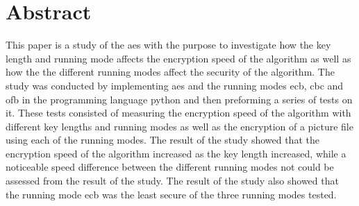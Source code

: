 \documentclass[a4paper, 12pt]{report}
\newcommand{\fakechapter}[2]{%
  \par\setcounter{chapter}{#2}
  \chaptermark{#1}
  \rhead{ }
}
\begin{document}
\chapter*{Abstract}
This paper is a study of the \acrlong{aes} with the purpose to investigate how the key length and running mode affects the encryption speed of the algorithm
as well as how the the different running modes affect the security of the algorithm. The study was conducted by implementing \acrshort{aes} and the running modes \acrshort{ecb}, \acrshort{cbc} and \acrshort{ofb} in the programming language \gls{python} and
then preforming a series of tests on it. These tests consisted of measuring the encryption speed of the algorithm with different key lengths and running modes as well as the encryption
of a picture file using each of the running modes. The result of the study showed that the encryption speed of the algorithm increased as the key length increased, while a noticeable speed difference
between the different running modes not could be assessed from the result of the study. The result of the study also showed that the running mode \acrshort{ecb} was the least secure of the three
running modes tested.


\tableofcontents

\listoffigures

\clearpage

\printglossary

\printglossary[type=\acronymtype, style=super]













\fakechapter{Källförteckning}{7}
\printbibliography[title=Källförteckning]

\clearpage



\end{document}
